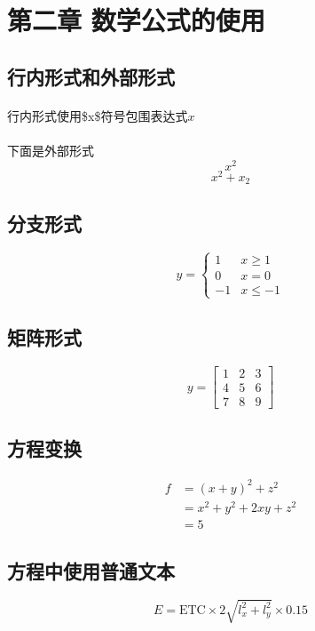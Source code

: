 \section{\color[rgb]{0.2,0.4,0.6} {第二章 数学公式的使用}}

\subsection{行内形式和外部形式}
\paragraph{} 行内形式使用\$x\$符号包围表达式$x$
\paragraph{} 下面是外部形式
$$x^2$$
\[
x^2 + x_2
\]
\subsection{分支形式}
\begin{equation}
	y = \begin{cases}
		1 & x\geq 1\\
		0 & x=0 \\
		-1 & x\leq -1
	\end{cases}
\end{equation}

\subsection{矩阵形式}
\begin{equation}
	y = \left[\begin{array}{ccc}
		1&2&3 \\
		4&5&6 \\
		7&8&9
	\end{array}\right]
\end{equation}

\subsection{方程变换}
\begin{align}
	f &= (x+y)^2 + z^2\nonumber \\
	  &= x^2 + y^2 + 2xy + z^2 \\
	  &= 5\nonumber
\end{align}

\subsection{方程中使用普通文本}
\begin{equation}
	E = \text{ETC} \times 2\sqrt{l_x^2 + l_y^2} \times 0.15
\end{equation}

